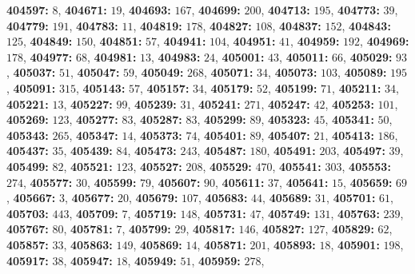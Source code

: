 \textsf{\bfseries 404597:} $8$, \textsf{\bfseries 404671:} $19$, \textsf{\bfseries 404693:} $167$, \textsf{\bfseries 404699:} $200$, \textsf{\bfseries 404713:} $195$, \textsf{\bfseries 404773:} $39$, \textsf{\bfseries 404779:} $191$, \textsf{\bfseries 404783:} $11$, \textsf{\bfseries 404819:} $178$, \textsf{\bfseries 404827:} $108$, \textsf{\bfseries 404837:} $152$, \textsf{\bfseries 404843:} $125$, \textsf{\bfseries 404849:} $150$, \textsf{\bfseries 404851:} $57$, \textsf{\bfseries 404941:} $104$, \textsf{\bfseries 404951:} $41$, \textsf{\bfseries 404959:} $192$, \textsf{\bfseries 404969:} $178$, \textsf{\bfseries 404977:} $68$, \textsf{\bfseries 404981:} $13$, \textsf{\bfseries 404983:} $24$, \textsf{\bfseries 405001:} $43$, \textsf{\bfseries 405011:} $66$, \textsf{\bfseries 405029:} $93$, \textsf{\bfseries 405037:} $51$, \textsf{\bfseries 405047:} $59$, \textsf{\bfseries 405049:} $268$, \textsf{\bfseries 405071:} $34$, \textsf{\bfseries 405073:} $103$, \textsf{\bfseries 405089:} $195$, \textsf{\bfseries 405091:} $315$, \textsf{\bfseries 405143:} $57$, \textsf{\bfseries 405157:} $34$, \textsf{\bfseries 405179:} $52$, \textsf{\bfseries 405199:} $71$, \textsf{\bfseries 405211:} $34$, \textsf{\bfseries 405221:} $13$, \textsf{\bfseries 405227:} $99$, \textsf{\bfseries 405239:} $31$, \textsf{\bfseries 405241:} $271$, \textsf{\bfseries 405247:} $42$, \textsf{\bfseries 405253:} $101$, \textsf{\bfseries 405269:} $123$, \textsf{\bfseries 405277:} $83$, \textsf{\bfseries 405287:} $83$, \textsf{\bfseries 405299:} $89$, \textsf{\bfseries 405323:} $45$, \textsf{\bfseries 405341:} $50$, \textsf{\bfseries 405343:} $265$, \textsf{\bfseries 405347:} $14$, \textsf{\bfseries 405373:} $74$, \textsf{\bfseries 405401:} $89$, \textsf{\bfseries 405407:} $21$, \textsf{\bfseries 405413:} $186$, \textsf{\bfseries 405437:} $35$, \textsf{\bfseries 405439:} $84$, \textsf{\bfseries 405473:} $243$, \textsf{\bfseries 405487:} $180$, \textsf{\bfseries 405491:} $203$, \textsf{\bfseries 405497:} $39$, \textsf{\bfseries 405499:} $82$, \textsf{\bfseries 405521:} $123$, \textsf{\bfseries 405527:} $208$, \textsf{\bfseries 405529:} $470$, \textsf{\bfseries 405541:} $303$, \textsf{\bfseries 405553:} $274$, \textsf{\bfseries 405577:} $30$, \textsf{\bfseries 405599:} $79$, \textsf{\bfseries 405607:} $90$, \textsf{\bfseries 405611:} $37$, \textsf{\bfseries 405641:} $15$, \textsf{\bfseries 405659:} $69$, \textsf{\bfseries 405667:} $3$, \textsf{\bfseries 405677:} $20$, \textsf{\bfseries 405679:} $107$, \textsf{\bfseries 405683:} $44$, \textsf{\bfseries 405689:} $31$, \textsf{\bfseries 405701:} $61$, \textsf{\bfseries 405703:} $443$, \textsf{\bfseries 405709:} $7$, \textsf{\bfseries 405719:} $148$, \textsf{\bfseries 405731:} $47$, \textsf{\bfseries 405749:} $131$, \textsf{\bfseries 405763:} $239$, \textsf{\bfseries 405767:} $80$, \textsf{\bfseries 405781:} $7$, \textsf{\bfseries 405799:} $29$, \textsf{\bfseries 405817:} $146$, \textsf{\bfseries 405827:} $127$, \textsf{\bfseries 405829:} $62$, \textsf{\bfseries 405857:} $33$, \textsf{\bfseries 405863:} $149$, \textsf{\bfseries 405869:} $14$, \textsf{\bfseries 405871:} $201$, \textsf{\bfseries 405893:} $18$, \textsf{\bfseries 405901:} $198$, \textsf{\bfseries 405917:} $38$, \textsf{\bfseries 405947:} $18$, \textsf{\bfseries 405949:} $51$, \textsf{\bfseries 405959:} $278$, 
